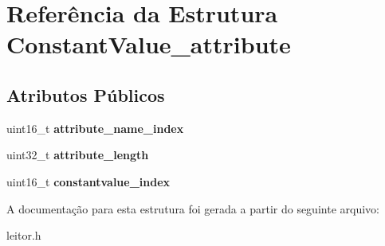 \hypertarget{structConstantValue__attribute}{\section{Referência da Estrutura Constant\-Value\-\_\-attribute}
\label{structConstantValue__attribute}
}
\subsection*{Atributos Públicos}
\begin{DoxyCompactItemize}
\item 
\hypertarget{structConstantValue__attribute_a84cf9dfe091dd4fc8685e7ae63461479}{uint16\-\_\-t {\bfseries attribute\-\_\-name\-\_\-index}}\label{structConstantValue__attribute_a84cf9dfe091dd4fc8685e7ae63461479}

\item 
\hypertarget{structConstantValue__attribute_a6709389b0ec67c4f93c7d24ca4d2740d}{uint32\-\_\-t {\bfseries attribute\-\_\-length}}\label{structConstantValue__attribute_a6709389b0ec67c4f93c7d24ca4d2740d}

\item 
\hypertarget{structConstantValue__attribute_a403cfba15ceb19a3715106a3a9822cc5}{uint16\-\_\-t {\bfseries constantvalue\-\_\-index}}\label{structConstantValue__attribute_a403cfba15ceb19a3715106a3a9822cc5}

\end{DoxyCompactItemize}


A documentação para esta estrutura foi gerada a partir do seguinte arquivo\-:\begin{DoxyCompactItemize}
\item 
leitor.\-h\end{DoxyCompactItemize}
